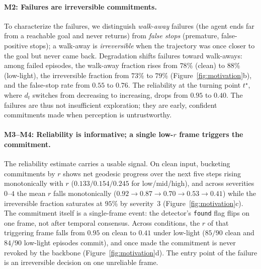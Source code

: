 \paragraph{M2: Failures are irreversible commitments.}
To characterize the failures, we distinguish \emph{walk-away} failures (the
agent ends far from a reachable goal and never returns) from \emph{false
stops} (premature, false-positive stops); a walk-away is
\emph{irreversible} when the trajectory was once closer to the goal but
never came back. Degradation shifts failures toward walk-aways: among
failed episodes, the walk-away fraction rises from $78\%$ (clean) to
$88\%$ (low-light), the irreversible fraction from $73\%$ to $79\%$
(Figure~\ref{fig:motivation}b), and the false-stop rate from $0.55$ to
$0.76$. The reliability at the turning point $t^\star$, where $d_t$
switches from decreasing to increasing, drops from $0.95$ to $0.40$. The
failures are thus not insufficient exploration; they are early, confident
commitments made when perception is untrustworthy.

\paragraph{M3--M4: Reliability is informative; a single low-$r$ frame triggers the commitment.}
The reliability estimate carries a usable signal. On clean input, bucketing
commitments by $r$ shows net geodesic progress over the next five steps
rising monotonically with $r$ ($0.133/0.154/0.245$ for low/mid/high), and
across severities $0$--$4$ the mean $r$ falls monotonically
($0.92{\to}0.87{\to}0.70{\to}0.53{\to}0.41$) while the irreversible
fraction saturates at $95\%$ by severity~$3$ (Figure~\ref{fig:motivation}c).
The commitment itself is a single-frame event: the detector's
\texttt{found} flag flips on one frame, not after temporal consensus.
Across conditions, the $r$ of that triggering frame falls from $0.95$ on
clean to $0.41$ under low-light ($85/90$ clean and $84/90$ low-light
episodes commit), and
once made the commitment is never revoked by the backbone
(Figure~\ref{fig:motivation}d). The entry point of the failure is an
irreversible decision on one unreliable frame.


